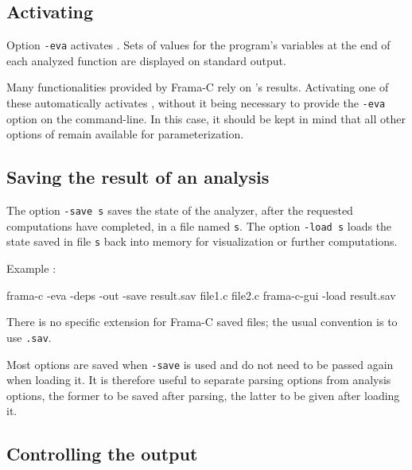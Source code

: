 \documentclass{frama-c-book}
\begin{document}
\subsection{Activating \Eva{}}

Option \lstinline|-eva| activates \Eva{}. Sets of
values for the program's variables at the end of each analyzed function
are displayed on standard output.

Many functionalities provided by Frama-C rely on \Eva{}'s
results. Activating one of these automatically activates \Eva{},
without it being necessary to provide the \lstinline|-eva|
option on the command-line.  In this case, it should be kept in mind
that all other options of \Eva{} remain available for
parameterization.

\subsection{Saving the result of an analysis}
\label{saving-result}

The option \lstinline|-save s|
saves the state of the analyzer, after the requested
computations have completed,
in a file named \lstinline|s|.
The option \lstinline|-load s| loads the state saved in file \lstinline|s|
back into memory for visualization or further computations.
\medskip

Example :
\begin{frama-c-commands}
frama-c -eva -deps -out -save result.sav file1.c file2.c
frama-c-gui -load result.sav
\end{frama-c-commands}

\begin{important}
  There is no specific extension for Frama-C saved files; the usual
  convention is to use \verb|.sav|.
\end{important}

\begin{important}
  Most options are saved when \verb|-save| is used and do not need to
  be passed again when loading it. It is therefore useful to separate
  parsing options from analysis options, the former to be saved after
  parsing, the latter to be given after loading it.
\end{important}

\subsection{Controlling  the output}
\end{document}
